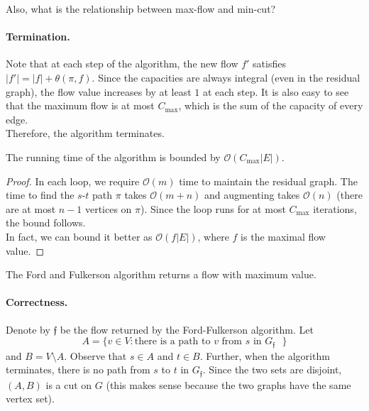 Also, what is the relationship between max-flow and min-cut?

\paragraph{Termination.} Note that at each step of the algorithm, the new flow $f'$ satisfies $|f'|=|f|+\theta(\pi,f)$. Since the capacities are always integral (even in the residual graph), the flow value increases by at least $1$ at each step. It is also easy to see that the maximum flow is at most $C_{\text{max}}$, which is the sum of the capacity of every edge.\\
Therefore, the algorithm terminates.

\begin{lemma}
	The running time of the algorithm is bounded by $\mathcal{O}(C_{\text{max}}|E|)$.
\end{lemma}
\begin{proof}
	In each loop, we require $\mathcal{O}(m)$ time to maintain the residual graph. The time to find the $s$-$t$ path $\pi$ takes $\mathcal{O}(m+n)$ and augmenting takes $\mathcal{O}(n)$ (there are at most $n-1$ vertices on $\pi$). Since the loop runs for at most $C_{\text{max}}$ iterations, the bound follows.\\
	In fact, we can bound it better as $\mathcal{O}(f|E|)$, where $f$ is the maximal flow value.
\end{proof}

\begin{lemma}
	The Ford and Fulkerson algorithm returns a flow with maximum value.
\end{lemma}

\paragraph{Correctness.} Denote by $\mathfrak{f}$ be the flow returned by the Ford-Fulkerson algorithm. Let
\[ A = \{v\in V : \text{there is a path to $v$ from $s$ in $G_{\mathfrak{f}}$ }\} \]
and $B=V\setminus A$. Observe that $s\in A$ and $t\in B$. Further, when the algorithm terminates, there is no path from $s$ to $t$ in $G_\mathfrak{f}$. Since the two sets are disjoint, $(A,B)$ is a cut on $G$ (this makes sense because the two graphs have the same vertex set).

